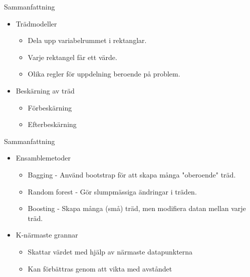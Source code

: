 \documentclass[10pt,english]{beamer}
\begin{document}
\begin{frame}{Sammanfattning}
    \begin{itemize}
        \item Trädmodeller
        \begin{itemize}
            \item Dela upp variabelrummet i rektanglar.
            \item Varje rektangel får ett värde.
            \item Olika regler för uppdelning beroende på problem.
        \end{itemize}
        \item Beskärning av träd
        \begin{itemize}
            \item Förbeskärning
            \item Efterbeskärning
        \end{itemize}
    \end{itemize}
\end{frame}

\begin{frame}{Sammanfattning}
    
    \begin{itemize}
        \item Ensamblemetoder
        \begin{itemize}
            \item Bagging - Använd bootstrap för att skapa många "oberoende" träd.
            \item Random forest - Gör slumpmässiga ändringar i träden.
            \item Boosting - Skapa många (små) träd, men modifiera datan mellan varje träd.
        \end{itemize}
        \item K-närmaste grannar
        \begin{itemize}
            \item Skattar värdet med hjälp av närmaste datapunkterna
            \item Kan förbättras genom att vikta med avståndet
        \end{itemize}
    \end{itemize}

\end{frame}
\end{document}
